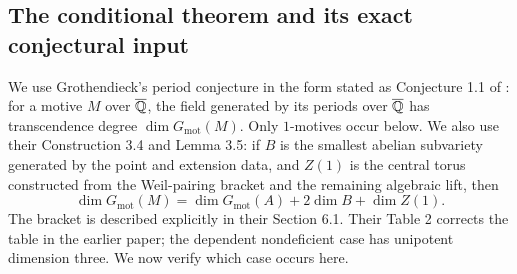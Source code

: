 \subsection{The conditional theorem and its exact conjectural input}

We use Grothendieck's period conjecture in the form stated as
Conjecture 1.1 of \citet{bertolin2022}: for a motive $M$ over
$\overline{\mathbb Q}$, the field generated by its periods over
$\overline{\mathbb Q}$ has transcendence degree $\dim G_{\mathrm{mot}}(M)$.
Only $1$-motives occur below. We also use their Construction 3.4
and Lemma 3.5: if $B$ is the smallest abelian subvariety
generated by the point and extension data, and $Z(1)$ is the
central torus constructed from the Weil-pairing bracket and
the remaining algebraic lift, then
\begin{equation}\label{eq:cp-MTdim}
 \dim G_{\mathrm{mot}}(M)
 =\dim G_{\mathrm{mot}}(A)+2\dim B+\dim Z(1).
\end{equation}
The bracket is described explicitly in their Section 6.1.
Their Table 2 corrects the table in the earlier paper; the
dependent nondeficient case has unipotent dimension three.
We now verify which case occurs here.

